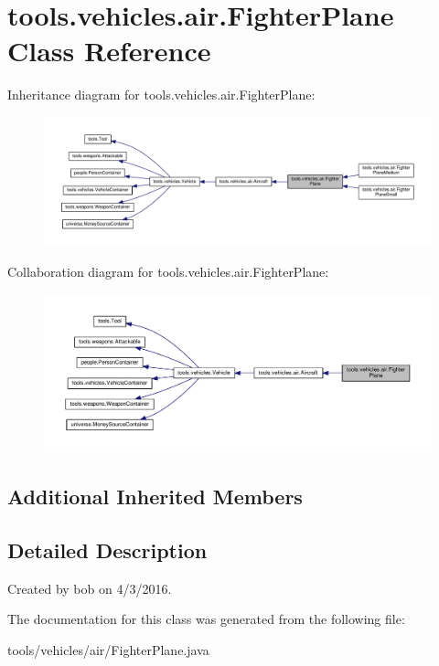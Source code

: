 \hypertarget{classtools_1_1vehicles_1_1air_1_1_fighter_plane}{}\section{tools.\+vehicles.\+air.\+Fighter\+Plane Class Reference}
\label{classtools_1_1vehicles_1_1air_1_1_fighter_plane}


Inheritance diagram for tools.\+vehicles.\+air.\+Fighter\+Plane\+:\nopagebreak
\begin{figure}[H]
\begin{center}
\leavevmode
\includegraphics[width=350pt]{classtools_1_1vehicles_1_1air_1_1_fighter_plane__inherit__graph}
\end{center}
\end{figure}


Collaboration diagram for tools.\+vehicles.\+air.\+Fighter\+Plane\+:\nopagebreak
\begin{figure}[H]
\begin{center}
\leavevmode
\includegraphics[width=350pt]{classtools_1_1vehicles_1_1air_1_1_fighter_plane__coll__graph}
\end{center}
\end{figure}
\subsection*{Additional Inherited Members}


\subsection{Detailed Description}
Created by bob on 4/3/2016. 

The documentation for this class was generated from the following file\+:\begin{DoxyCompactItemize}
\item 
tools/vehicles/air/Fighter\+Plane.\+java\end{DoxyCompactItemize}

